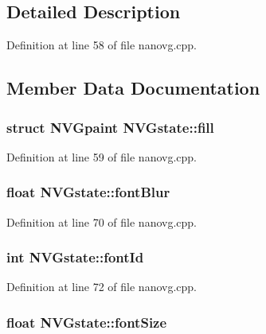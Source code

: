 \subsection{Detailed Description}


Definition at line 58 of file nanovg.\+cpp.



\subsection{Member Data Documentation}
\hypertarget{struct_n_v_gstate_a1360acd78a82e03ea2184b295630572c}{
\subsubsection[{fill}]{\setlength{\rightskip}{0pt plus 5cm}struct {\bf N\+V\+Gpaint} N\+V\+Gstate\+::fill}}\label{struct_n_v_gstate_a1360acd78a82e03ea2184b295630572c}


Definition at line 59 of file nanovg.\+cpp.

\hypertarget{struct_n_v_gstate_ad282c241982571cd28296bdc42a3e167}{
\subsubsection[{font\+Blur}]{\setlength{\rightskip}{0pt plus 5cm}float N\+V\+Gstate\+::font\+Blur}}\label{struct_n_v_gstate_ad282c241982571cd28296bdc42a3e167}


Definition at line 70 of file nanovg.\+cpp.

\hypertarget{struct_n_v_gstate_a714541c6c402eb466a54610696218215}{
\subsubsection[{font\+Id}]{\setlength{\rightskip}{0pt plus 5cm}int N\+V\+Gstate\+::font\+Id}}\label{struct_n_v_gstate_a714541c6c402eb466a54610696218215}


Definition at line 72 of file nanovg.\+cpp.

\hypertarget{struct_n_v_gstate_a58d3ac1b707cbe651244a7bc00a84dc2}{
\subsubsection[{font\+Size}]{\setlength{\rightskip}{0pt plus 5cm}float N\+V\+Gstate\+::font\+Size}}\label{struct_n_v_gstate_a58d3ac1b707cbe651244a7bc00a84dc2}


